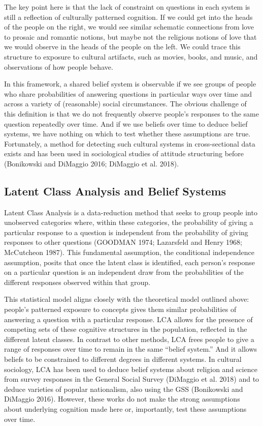 \documentclass[12pt,]{article}
\begin{document}
The key point here is that the lack of constraint on questions in each system is still a reflection of culturally patterned cognition. If we could get into the heads of the people on the right, we would see similar schematic connections from love to prosaic and romantic notions, but maybe not the religious notions of love that we would observe in the heads of the people on the left. We could trace this structure to exposure to cultural artifacts, such as movies, books, and music, and observations of how people behave.

In this framework, a shared belief system is observable if we see groups of people who share probabilities of answering questions in particular ways over time and across a variety of (reasonable) social circumstances. The obvious challenge of this definition is that we do not frequently observe people's responses to the same question repeatedly over time. And if we use beliefs over time to deduce belief systems, we have nothing on which to test whether these assumptions are true. Fortunately, a method for detecting such cultural systems in cross-sectional data exists and has been used in sociological studies of attitude structuring before (Bonikowski and DiMaggio 2016; DiMaggio et al. 2018).

\hypertarget{latent-class-analysis-and-belief-systems}{%
\subsection{Latent Class Analysis and Belief Systems}\label{latent-class-analysis-and-belief-systems}}

Latent Class Analysis is a data-reduction method that seeks to group people into unobserved categories where, within these categories, the probability of giving a particular response to a question is independent from the probability of giving responses to other questions (GOODMAN 1974; Lazarsfeld and Henry 1968; McCutcheon 1987). This fundamental assumption, the conditional independence assumption, posits that once the latent class is identified, each person's response on a particular question is an independent draw from the probabilities of the different responses observed within that group.

This statistical model aligns closely with the theoretical model outlined above: people's patterned exposure to concepts gives them similar probabilities of answering a question with a particular response. LCA allows for the presence of competing sets of these cognitive structures in the population, reflected in the different latent classes. In contrast to other methods, LCA frees people to give a range of responses over time to remain in the same ``belief system.'' And it allows beliefs to be constrained to different degrees in different systems. In cultural sociology, LCA has been used to deduce belief systems about religion and science from survey responses in the General Social Survey (DiMaggio et al. 2018) and to deduce varieties of popular nationalism, also using the GSS (Bonikowski and DiMaggio 2016). However, these works do not make the strong assumptions about underlying cognition made here or, importantly, test these assumptions over time.
\end{document}
